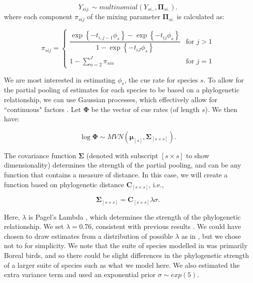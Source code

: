 $$Y_{sij.} \sim multinomial\left(Y_{si..}, \mathbf{\Pi}_{si.}\right).$$
where each component $\pi_{sij}$ of the mixing parameter $\mathbf{\Pi}_{si.}$ is calculated as:

\begin{equation*}
	\pi_{sij} = 
	\begin{cases}
		\dfrac{\exp\left\{ -t_{i,j-1}\phi_{s} \right\} - \exp\left\{ -t_{ij}\phi_{s} \right\}}{1 - \exp\left\{ -t_{iJ}\phi_{s} \right\}} & \text{for } j > 1 \\
		1 - \sum_{n = 2}^{J} \pi_{sin} & \text{for } j = 1
	\end{cases}
\end{equation*}

\par We are most interested in estimating $\phi_s$, the cue rate for species $s$. 
To allow for the partial pooling of estimates for each species to be based on a phylogenetic relationship, we can use Gaussian processes, which effectively allow for ``continuous" factors \citep{bernardo_regression_1998, mcelreath_continous_2020}. 
Let $\mathbf{\Phi}$ be the vector of cue rates (of length $s$). 
We then have:

$$\log \mathbf{\Phi} \sim MVN\left( \mathbf{\mu}_{[s]}, \mathbf{\Sigma}_{[s \times s]} \right).$$

\par The covariance function $\mathbf{\Sigma}$ (denoted with subscript $[s \times s]$ to show dimensionality) determines the strength of the partial pooling, and can be any function that contains a measure of distance. 
In this case, we will create a function based on phylogenetic distance $\mathbf{C}_{[s \times s]}$, i.e.,

$$\mathbf{\Sigma}_{[s \times s]} = \mathbf{C}_{[s \times s]}\lambda\sigma.$$

\par Here, $\lambda$ is Pagel's Lambda \citep{pagel_inferring_1999}, which determines the strength of the phylogenetic relationship. 
We set $\lambda = 0.76$, consistent with previous results \cite{solymos_phylogeny_2018}. 
We could have chosen to draw estimates from a distribution of possible $\lambda$ as in \citet{solymos_phylogeny_2018}, but we chose not to for simplicity. 
We note that the suite of species modelled in \citet{solymos_evaluating_2018} was primarily Boreal birds, and so there could be slight differences in the phylogenetic strength of a larger suite of species such as what we model here.
We also estimated the extra variance term and used an exponential prior $\sigma \sim exp(5)$.

